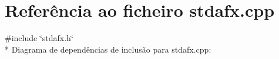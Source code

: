 \hypertarget{a00016}{\section{Referência ao ficheiro stdafx.\+cpp}
\label{a00016}
}
{\ttfamily \#include \char`\"{}stdafx.\+h\char`\"{}}\\*
Diagrama de dependências de inclusão para stdafx.\+cpp\+:
